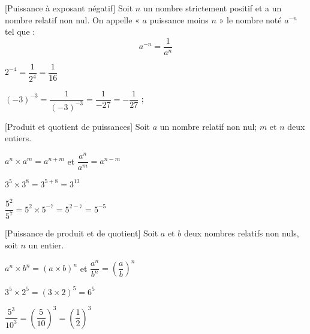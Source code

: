 \noindent \begin{minipage}{11cm}
\begin{defi}{}{}[Puissance à exposant négatif]
Soit $n$ un nombre strictement positif et a un nombre relatif non nul. On appelle « $a$ puissance moins $n$ » le nombre noté $a^{-n}$ tel que :  $$a^{-n} = \dfrac{1}{a^n}$$
\end{defi}
\end{minipage}
\hspace{5mm}
\begin{minipage}{5cm}
\begin{ex}{}{}
$2^{-4} = \dfrac{1}{2^4} = \dfrac{1}{16}$ 

$(-3)^{-3} = \dfrac{1}{(-3)^{-3}} = \dfrac{1}{-27} = -\dfrac{1}{27}$  ;
\end{ex}  
\end{minipage}

\noindent \begin{minipage}{11cm}
\begin{prop}{}{}[Produit et quotient de puissances]
Soit $a$ un nombre relatif non nul; $m$ et $n$ deux entiers.
\begin{center}
$a^n \times a^m = a^{n+m}$ \hspace{0.5cm} et \hspace{0.5cm} $\dfrac{a^n}{a^m} = a^{n-m}$
\end{center}
\end{prop}
\end{minipage}
\hspace{5mm}
\begin{minipage}{5cm}
\begin{ex}{}{}
$3^5 \times 3^8 = 3^{5+8} = 3^{13}$

$\dfrac{5^2}{5^7} = 5^2 \times 5^{-7} = 5^{2-7} = 5^{-5}$
\end{ex} 
\end{minipage}

\noindent \begin{minipage}{11cm}
\begin{prop}{}{}[Puissance de produit et de quotient]
Soit $a$ et $b$ deux nombres relatifs non nuls, soit $n$ un entier.
\begin{center}
$a^n \times b^n = (a\times b)^{n}$ \hspace{0.5cm} et \hspace{0.5cm} $\dfrac{a^n}{b^n} = \left( \dfrac{a}{b} \right)^{n}$
\end{center}
\end{prop}
\end{minipage}
\hspace{5mm}
\begin{minipage}{5cm}
\begin{ex}{}{}
$3^5 \times 2^5 = (3\times 2)^{5} = 6^5$

$\dfrac{5^3}{10^3} = \left( \dfrac{5}{10} \right)^{3} = \left( \dfrac{1}{2} \right)^{3}$
\end{ex}
\end{minipage}

